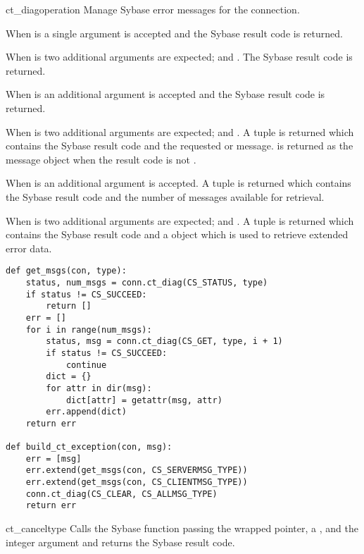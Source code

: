 \begin{methoddesc}[CS_CONNECTION]{ct_diag}{operation \optional{, \ldots}}
Manage Sybase error messages for the connection.

When  is  a single argument is accepted
and the Sybase result code is returned.

When  is  two additional arguments
are expected;  and .  The Sybase result code is
returned.

When  is  an additional 
argument is accepted and the Sybase result code is returned.

When  is  two additional arguments are
expected;  and .  A tuple is returned which
contains the Sybase result code and the requested 
or  message.   is returned as the
message object when the result code is not .

When  is  an additional 
argument is accepted.  A tuple is returned which contains the Sybase
result code and the number of messages available for retrieval.

When  is  two additional arguments are
expected;  and .  A tuple is returned which
contains the Sybase result code and a  object which
is used to retrieve extended error data.

\begin{verbatim}
def get_msgs(con, type):
    status, num_msgs = conn.ct_diag(CS_STATUS, type)
    if status != CS_SUCCEED:
        return []
    err = []
    for i in range(num_msgs):
        status, msg = conn.ct_diag(CS_GET, type, i + 1)
        if status != CS_SUCCEED:
            continue
        dict = {}
        for attr in dir(msg):
            dict[attr] = getattr(msg, attr)
        err.append(dict)
    return err

def build_ct_exception(con, msg):
    err = [msg]
    err.extend(get_msgs(con, CS_SERVERMSG_TYPE))
    err.extend(get_msgs(con, CS_CLIENTMSG_TYPE))
    conn.ct_diag(CS_CLEAR, CS_ALLMSG_TYPE)
    return err
\end{verbatim}
\end{methoddesc}

\begin{methoddesc}[CS_CONNECTION]{ct_cancel}{type}
Calls the Sybase  function passing the wrapped
 pointer, a  , and the
integer  argument and returns the Sybase result code.
\end{methoddesc}

